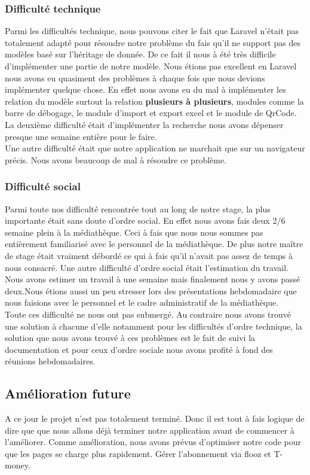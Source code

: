 \documentclass[14pt,a4paper]{article}
\begin{document}
\subsubsection{Difficulté technique}
Parmi les difficultés technique, nous pouvons citer le fait que Laravel n'était pas totalement
adapté pour résoudre notre problème du fais qu'il ne support pas des modèles basé sur l'héritage
de donnée. De ce fait il nous à été très difficile d'implémenter une partie de notre modèle.
Nous étions pas excellent en Laravel nous avons eu quasiment des problèmes à chaque
fois que nous devions implémenter quelque chose. En effet nous avons eu du mal à implémenter les 
relation du modèle surtout la relation \textbf{plusieurs à plusieurs}, modules comme la barre 
de débogage, le module d'import et export excel et le module de QrCode.\\
La deuxième difficulté était d'implémenter la recherche nous avons dépenser presque une semaine entière pour le faire.\\
Une autre difficulté était que notre application ne marchait que sur un navigateur
précis. Nous avons beaucoup de mal à résoudre ce problème. 

\subsubsection{Difficulté social} 
Parmi toute nos difficulté rencontrée tout au long de notre stage, la plus importante était sans doute d'ordre social. En effet nous avons fais deux 2/6 semaine plein à la médiathèque. Ceci à fais que nous nous sommes pas 
entièrement familiarisé avec le personnel de la médiathèque. De plus notre maître 
de stage était vraiment débordé ce qui à fais qu'il n'avait pas assez de temps à nous
consacré. Une autre difficulté d'ordre social était l'estimation du travail. Nous
avons estimer un travail à une semaine mais finalement nous y avons passé deux.Nous
étions aussi un peu stresser lors des présentations hebdomadaire que nous faisions avec le personnel et le cadre administratif de la médiathèque.\\

Toute ces difficulté ne nous ont pas submergé. Au contraire nous avons trouvé une 
solution à chacune d'elle notamment pour les difficultés d'ordre technique, la solution 
que nous avons trouvé à ces problèmes est le fait de suivi la documentation et pour ceux 
d'ordre sociale nous avons profité à fond des réunions hebdomadaires.

\subsection{Amélioration future}
A ce jour le projet n'est pas totalement terminé. Donc il est tout à fais logique de dire que
que nous allons déjà terminer notre application avant de commencer à l'améliorer.
Comme amélioration, nous avons prévus d'optimiser notre code pour que les pages se charge 
plus rapidement. Gérer l'abonnement via flooz et T-money.
\end{document}
